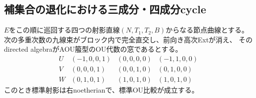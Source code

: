 \subsection{補集合の退化における三成分・四成分cycle}
\label{subsec:ou-complement-expanded-cycles}

\begin{lemma}[四成分cycleの参照爆発と標準比較]
\label{lem:ou-four-cycle-proximity-comparison}
$E$をこの順に巡回する四つの射影直線$(N,T_1,T_2,B)$からなる節点曲線とする。
次の多重次数の九線束がブロック内で完全直交し、前向き高次Extが消え、
そのdirected algebraがAOU箙型のOU代数の窓であるとする。
\[
\begin{array}{c|ccc}
 U&(-1,0,0,1)&(0,0,0,0)&(-1,1,0,0)\\
 V&(0,0,0,1)&(0,0,1,0)&(0,1,0,0)\\
 W&(0,1,0,1)&(1,0,1,0)&(1,0,1,0)
\end{array}
\]
このとき標準射影は右noetherianで、標準OU比較が成立する。
\end{lemma}
